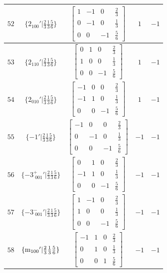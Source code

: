 \documentclass[fleqn,8pt]{jsarticle}
\begin{document}
\begin{longtable}{ccccc}
$ 52 $ & $ \{2{}_{100}{}'|\frac{2}{3} \frac{1}{3} \frac{5}{6}\} $ & $ \begin{bmatrix} 1 & -1 & 0 & \frac{2}{3} \\ 0 & -1 & 0 & \frac{1}{3} \\ 0 & 0 & -1 & \frac{5}{6} \end{bmatrix} $ & $ 1 $ & $ -1 $ \\ \hline
$ 53 $ & $ \{2{}_{110}{}'|\frac{2}{3} \frac{1}{3} \frac{5}{6}\} $ & $ \begin{bmatrix} 0 & 1 & 0 & \frac{2}{3} \\ 1 & 0 & 0 & \frac{1}{3} \\ 0 & 0 & -1 & \frac{5}{6} \end{bmatrix} $ & $ 1 $ & $ -1 $ \\ \hline
$ 54 $ & $ \{2{}_{010}{}'|\frac{2}{3} \frac{1}{3} \frac{5}{6}\} $ & $ \begin{bmatrix} -1 & 0 & 0 & \frac{2}{3} \\ -1 & 1 & 0 & \frac{1}{3} \\ 0 & 0 & -1 & \frac{5}{6} \end{bmatrix} $ & $ 1 $ & $ -1 $ \\ \hline
$ 55 $ & $ \{-1{}'|\frac{2}{3} \frac{1}{3} \frac{5}{6}\} $ & $ \begin{bmatrix} -1 & 0 & 0 & \frac{2}{3} \\ 0 & -1 & 0 & \frac{1}{3} \\ 0 & 0 & -1 & \frac{5}{6} \end{bmatrix} $ & $ -1 $ & $ -1 $ \\ \hline
$ 56 $ & $ \{-3^{+}_{\,\,001}{}'|\frac{2}{3} \frac{1}{3} \frac{5}{6}\} $ & $ \begin{bmatrix} 0 & 1 & 0 & \frac{2}{3} \\ -1 & 1 & 0 & \frac{1}{3} \\ 0 & 0 & -1 & \frac{5}{6} \end{bmatrix} $ & $ -1 $ & $ -1 $ \\ \hline
$ 57 $ & $ \{-3^{-}_{\,\,001}{}'|\frac{2}{3} \frac{1}{3} \frac{5}{6}\} $ & $ \begin{bmatrix} 1 & -1 & 0 & \frac{2}{3} \\ 1 & 0 & 0 & \frac{1}{3} \\ 0 & 0 & -1 & \frac{5}{6} \end{bmatrix} $ & $ -1 $ & $ -1 $ \\ \hline
$ 58 $ & $ \{{\rm m}_{100}{}'|\frac{2}{3} \frac{1}{3} \frac{5}{6}\} $ & $ \begin{bmatrix} -1 & 1 & 0 & \frac{2}{3} \\ 0 & 1 & 0 & \frac{1}{3} \\ 0 & 0 & 1 & \frac{5}{6} \end{bmatrix} $ & $ -1 $ & $ -1 $ \\ \hline

\end{longtable}
\end{document}
